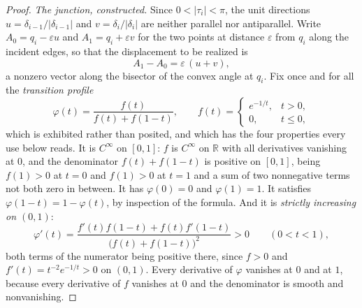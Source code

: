 \begin{proof}\leanok{}
\emph{The junction, constructed.} Since $0<|\tau_i|<\pi$, the unit directions
$u=\delta_{i-1}/|\delta_{i-1}|$ and $v=\delta_i/|\delta_i|$ are neither parallel
nor antiparallel. Write $A_0=q_i-\varepsilon u$ and $A_1=q_i+\varepsilon v$ for
the two points at distance $\varepsilon$ from $q_i$ along the incident edges, so
that the displacement to be realized is
\[
   A_1-A_0=\varepsilon\,(u+v),
\]
a nonzero vector along the bisector of the convex angle at $q_i$. Fix once and
for all the \emph{transition profile}
\[
   \varphi(t)=\frac{f(t)}{f(t)+f(1-t)},
   \qquad
   f(t)=\begin{cases} e^{-1/t}, & t>0,\\ 0,& t\leq0,\end{cases}
\]
which is exhibited rather than posited, and which has the four properties every
use below reads. It is $C^\infty$ on $[0,1]$: $f$ is $C^\infty$ on $\mathbb R$
with all derivatives vanishing at $0$, and the denominator
$f(t)+f(1-t)$ is positive on $[0,1]$, being $f(1)>0$ at $t=0$ and $f(1)>0$ at
$t=1$ and a sum of two nonnegative terms not both zero in between. It has
$\varphi(0)=0$ and $\varphi(1)=1$. It satisfies $\varphi(1-t)=1-\varphi(t)$, by
inspection of the formula. And it is \emph{strictly increasing on $(0,1)$}:
\[
   \varphi'(t)=\frac{f'(t)f(1-t)+f(t)f'(1-t)}{\bigl(f(t)+f(1-t)\bigr)^2}>0
   \qquad (0<t<1),
\]
both terms of the numerator being positive there, since $f>0$ and
$f'(t)=t^{-2}e^{-1/t}>0$ on $(0,1)$. Every derivative of $\varphi$ vanishes at
$0$ and at $1$, because every derivative of $f$ vanishes at $0$ and the
denominator is smooth and nonvanishing.


\end{proof}
